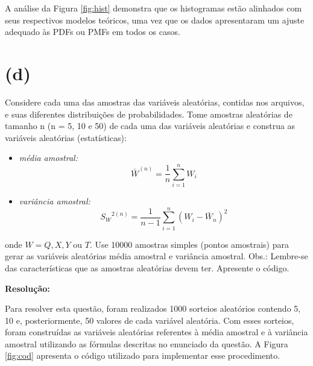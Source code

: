 \documentclass[]{abntex2}
\begin{document}
A análise da Figura \ref{fig:hist} demonstra que os histogramas estão alinhados com seus respectivos modelos teóricos, uma vez que os dados apresentaram um ajuste adequado às PDFs ou PMFs em todos os casos.

\section*{\textbf{(d)}}

\noindent Considere cada uma das amostras das variáveis aleatórias, contidas nos arquivos, e suas diferentes distribuições de probabilidades. Tome amostras aleatórias de tamanho n (n = 5, 10 e 50) de cada uma das variáveis aleatórias e construa as variáveis aleatórias (estatísticas):

\begin{itemize}
    \item \textit{média amostral:} \[{\bar{W}}^{(n)}=\dfrac{1}{n} \sum_{i=1}^{n} W_i\]
    \item \textit{variância amostral:} \[{S_W}^{2(n)}=\dfrac{1}{n-1} \sum_{i=1}^{n}(W_i - \bar{W}_n)^2\]
\end{itemize}

onde $W = Q, X, Y$ ou $T$. Use 10000 amostras simples (pontos amostrais) para gerar
as variáveis aleatórias média amostral e variância amostral. Obs.: Lembre-se das
características que as amostras aleatórias devem ter. Apresente o código.

\textbf{Resolução:}

Para resolver esta questão, foram realizados 1000 sorteios aleatórios contendo 5, 10 e, posteriormente, 50 valores de cada variável aleatória. Com esses sorteios, foram construídas as variáveis aleatórias referentes à média amostral e à variância amostral utilizando as fórmulas descritas no enunciado da questão. A Figura \ref{fig:cod} apresenta o código utilizado para implementar esse procedimento.
\end{document}
